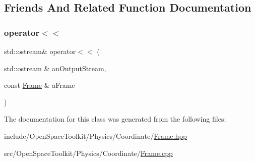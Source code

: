 \subsection{Friends And Related Function Documentation}
\mbox{\label{classostk_1_1physics_1_1coord_1_1_frame_a509ac1926cfc3553748bace204e2b1cc}} 
\subsubsection{\texorpdfstring{operator$<$$<$}{operator<<}}
{\footnotesize\ttfamily std\+::ostream\& operator$<$$<$ (\begin{DoxyParamCaption}\item[{std\+::ostream \&}]{an\+Output\+Stream,  }\item[{const \hyperlink{classostk_1_1physics_1_1coord_1_1_frame}{Frame} \&}]{a\+Frame }\end{DoxyParamCaption})\hspace{0.3cm}{\ttfamily [friend]}}



The documentation for this class was generated from the following files\+:\begin{DoxyCompactItemize}
\item 
include/\+Open\+Space\+Toolkit/\+Physics/\+Coordinate/\hyperlink{_frame_8hpp}{Frame.\+hpp}\item 
src/\+Open\+Space\+Toolkit/\+Physics/\+Coordinate/\hyperlink{_frame_8cpp}{Frame.\+cpp}\end{DoxyCompactItemize}
